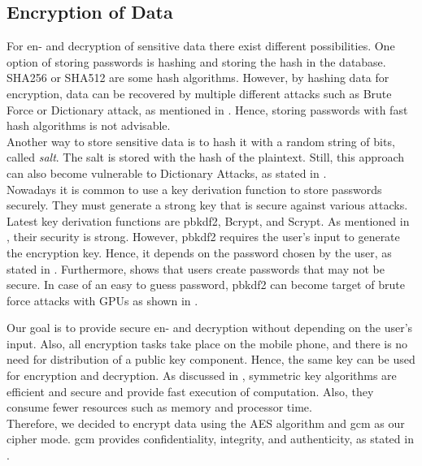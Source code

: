 \subsection{Encryption of Data}\label{arch_encryption}
For en- and decryption of sensitive data there exist different possibilities. One option of storing passwords is hashing and storing the hash in the database. SHA256 or SHA512 are some hash algorithms. However, by hashing data for encryption, data can be recovered by multiple different attacks such as Brute Force or Dictionary attack, as mentioned in \cite{ertaul2016implementation}. Hence, storing passwords with fast hash algorithms is not advisable. \\
Another way to store sensitive data is to hash it with a random string of bits, called \textit{salt}. The salt is stored with the hash of the plaintext. Still, this approach can also become vulnerable to Dictionary Attacks, as stated in \cite{3wrongways}. \\
Nowadays it is common to use a key derivation function to store passwords securely. They must generate a strong key that is secure against various attacks. Latest key derivation functions are \gls{pbkdf2}, Bcrypt, and Scrypt. As mentioned in \cite{ertaul2016implementation}, their security is strong.
However, \gls{pbkdf2} requires the user's input to generate the encryption key. Hence, it depends on the password chosen by the user, as stated in \cite{Agilebits}. Furthermore, \cite{YanBAG04} shows that users create passwords that may not be secure. In case of an easy to guess password, \gls{pbkdf2} can become target of brute force attacks with GPUs as shown in \cite{DurmuthGKPYZ12}.

Our goal is to provide secure en- and decryption without depending on the user's input. Also, all encryption tasks take place on the mobile phone, and there is no need for distribution of a public key component. Hence, the same key can be used for encryption and decryption. As discussed in \cite{bala2015asymmetric}, symmetric key algorithms are efficient and secure and provide fast execution of computation. Also, they consume fewer resources such as memory and processor time. \\ Therefore, we decided to encrypt data using the AES algorithm and \gls{gcm} as our cipher mode. \gls{gcm} provides confidentiality, integrity, and authenticity, as stated in \cite{AESJavaAndroid}.

